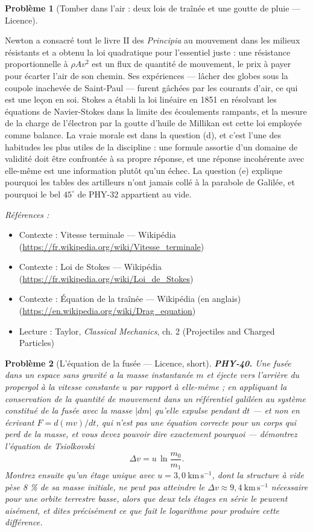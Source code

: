 \documentclass[11pt]{article}
\newtheorem{problem}{Problème}
\newenvironment{refs}{\par\small\noindent\emph{Références :}\begin{itemize}\setlength\itemsep{0pt}}{\end{itemize}\normalsize}
\begin{document}
\begin{problem}[{Tomber dans l'air : deux lois de traînée et une goutte de pluie --- Licence}]
\end{problem}

\noindent Newton a consacré tout le livre II des \textit{Principia} au mouvement dans les
milieux résistants et a obtenu la loi quadratique pour l'essentiel juste : une résistance
proportionnelle à $ \rho A v^{2} $ est un flux de quantité de mouvement, le prix à payer pour
écarter l'air de son chemin. Ses expériences --- lâcher des globes sous la coupole inachevée de
Saint-Paul --- furent gâchées par les courants d'air, ce qui est une leçon en soi. Stokes a établi
la loi linéaire en 1851 en résolvant les équations de Navier-Stokes dans la limite des
écoulements rampants, et la mesure de la charge de l'électron par la goutte d'huile de Millikan
est cette loi employée comme balance. La vraie morale est dans la question (d), et c'est l'une des
habitudes les plus utiles de la discipline : une formule assortie d'un domaine de validité doit
être confrontée à sa propre réponse, et une réponse incohérente avec elle-même est une
information plutôt qu'un échec. La question (e) explique pourquoi les tables des artilleurs n'ont
jamais collé à la parabole de Galilée, et pourquoi le bel $ 45^{\circ} $ de PHY-32 appartient au
vide.

\begin{refs}
\item Contexte : Vitesse terminale --- Wikipédia (\url{https://fr.wikipedia.org/wiki/Vitesse_terminale})
\item Contexte : Loi de Stokes --- Wikipédia (\url{https://fr.wikipedia.org/wiki/Loi_de_Stokes})
\item Contexte : Équation de la traînée --- Wikipédia (en anglais) (\url{https://en.wikipedia.org/wiki/Drag_equation})
\item Lecture : Taylor, \textit{Classical Mechanics}, ch. 2 (Projectiles and Charged Particles)
\end{refs}

\bigskip

\begin{problem}[{L'équation de la fusée --- Licence, short}]
\textbf{PHY-40.} Une fusée dans un espace sans gravité a la masse instantanée
$ m $ et éjecte vers l'arrière du propergol à la vitesse constante $ u $ par rapport à
elle-même ; en appliquant la conservation de la quantité de mouvement dans un référentiel
galiléen au système constitué de la fusée \textit{avec} la masse $ |dm| $ qu'elle expulse pendant
$ dt $ --- et non en écrivant $ F = d(mv)/dt $, qui n'est pas une équation correcte pour un
corps qui perd de la masse, et vous devez pouvoir dire exactement pourquoi --- démontrez l'équation
de Tsiolkovski
\[ \Delta v = u \, \ln\frac{m_{0}}{m_{1}}. \]
Montrez ensuite qu'un étage unique avec $ u = 3{,}0\ \mathrm{km\,s^{-1}} $, dont la structure à
vide pèse 8 \% de sa masse initiale, ne peut pas atteindre le
$ \Delta v \approx 9{,}4\ \mathrm{km\,s^{-1}} $ nécessaire pour une orbite terrestre basse,
alors que deux tels étages en série le peuvent aisément, et dites précisément ce que fait le
logarithme pour produire cette différence.
\end{problem}
\end{document}
